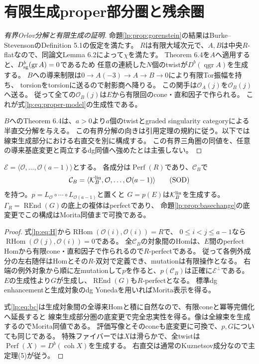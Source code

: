 \section{有限生成proper部分圏と残余圏}
\label{lp:sec:proper}
\begin{proof}[有界Orlov分解と有限生成の証明]
命題\ref{lp:prop:gorenstein}の結果はBurke--StevensonのDefinition 5.1の仮定を満たす。
$R$は有限大域次元で、$A,B$は中央$R$-flatなので、同論文Lemma 6.2によって$\chi$を満たす。
Theorem 6.4を$A$へ適用すると、$D_{\rm sg}^b(\operatorname{gr}A)=0$であるため
任意の連続した$N$個のtwistが$D^b(\operatorname{qgr}A)$を生成する。
$B$への導来制限は$0\to A(-3)\to A\to B\to0$により有限Tor振幅を持ち、
torsionをtorsionに送るので射影商へ降りる。
この関手は$\mathcal O_A(j)$を$\mathcal O_B(j)$へ送る。
従って全ての$\mathcal O_B(j)$は$E$から有限回のcone・直和因子で作られる。
これが式\eqref{lp:eq:proper-model}の生成性である。

$B$へのTheorem 6.4は、$a>0$より$a$個のtwistとgraded singularity categoryによる半直交分解を与える。
この有界分解の向きは引用定理の規約に従う。以下では線束生成部分における右直交を別に構成する。
この有界三角圏の同値を、任意の導来基底変更と両立するdg同値へ強めたとは主張しない。
\end{proof}

\begin{proposition}[properな残余dg代数]\label{lp:prop:residual}
$\mathcal E=\langle\mathcal O,\ldots,\mathcal O(a-1)\rangle$とする。
各成分は$\operatorname{Perf}(R)$であり、$\mathcal C_B$で
\[
 \mathcal C_B=\langle\mathcal K_B^{\rm lin},\mathcal O,\ldots,\mathcal O(a-1)\rangle
 \tag{SOD}\label{lp:eq:sod}
\]
を持つ。$p=L_{\mathcal O}\circ\cdots\circ L_{\mathcal O(a-1)}$と置くと
$G=p(E)$は$\mathcal K_B^{\rm lin}$を生成する。
$\Gamma_R=\operatorname{REnd}(G)$の底上の複体はperfectであり、
命題\ref{lp:prop:basechange}の底変更でこの構成はMorita同値まで可換である。
\end{proposition}
\begin{proof}
式\eqref{lp:eq:H}から$\operatorname{RHom}(\mathcal O(i),\mathcal O(i))=R$で、
$0\le i<j\le a-1$なら$\operatorname{RHom}(\mathcal O(j),\mathcal O(i))=0$である。
全$\mathcal C_B$の対象間のHomは、$E$間のperfect Homから有限cone・直和因子で作られるので$R$-perfectである。
従って各例外成分の左右随伴はHomとその$R$-双対で定義でき、mutationは有限操作となる。
右端の例外対象から順に左mutationして$p$を作ると、$p(\mathcal C_B)$は正確に$\mathcal E^\perp$である。
$E$の生成性より$G$が生成し、$\operatorname{REnd}(G)$も$R$-perfectとなる。
標準dg enhancementと生成対象のdg Yonedaを用いればMorita表示を得る\cite[Theorem 3.8]{LP-Keller}。

式\eqref{lp:eq:bc}は生成対象間の全導来Homと積に自然なので、有限coneと冪等完備化へ延長すると
線束生成部分圏の底変更で完全忠実性を得る。像は全線束を生成するのでMorita同値である。
評価写像とそのconeも底変更に可換で、$p,G$についても同じである。
特殊ファイバーでは$X$は滑らかで、全twistは$\operatorname{Perf}(X)=D^b(\operatorname{coh}X)$を生成する。
右直交は通常のKuznetsov成分なので主定理(5)が従う。
\end{proof}

